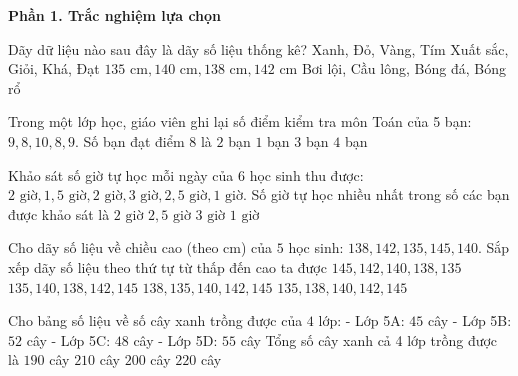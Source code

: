 \textbf{Phần 1. Trắc nghiệm lựa chọn}

\begin{ex} %
Dãy dữ liệu nào sau đây là dãy số liệu thống kê?
\choice
{Xanh, Đỏ, Vàng, Tím}
{Xuất sắc, Giỏi, Khá, Đạt}
{\True $135\text{ cm}, 140\text{ cm}, 138\text{ cm}, 142\text{ cm}$}
{Bơi lội, Cầu lông, Bóng đá, Bóng rổ}
\end{ex}

\begin{ex} %
Trong một lớp học, giáo viên ghi lại số điểm kiểm tra môn Toán của 5 bạn: $9, 8, 10, 8, 9$. Số bạn đạt điểm $8$ là
\choice
{\True $2$ bạn}
{$1$ bạn}
{$3$ bạn}
{$4$ bạn}
\end{ex}

\begin{ex} %
Khảo sát số giờ tự học mỗi ngày của $6$ học sinh thu được: $2\text{ giờ}, 1{,}5\text{ giờ}, 2\text{ giờ}, 3\text{ giờ}, 2{,}5\text{ giờ}, 1\text{ giờ}$. Số giờ tự học nhiều nhất trong số các bạn được khảo sát là
\choice
{$2\text{ giờ}$}
{$2{,}5\text{ giờ}$}
{\True $3\text{ giờ}$}
{$1\text{ giờ}$}
\end{ex}

\begin{ex} %
Cho dãy số liệu về chiều cao (theo $\text{cm}$) của $5$ học sinh: $138, 142, 135, 145, 140$. Sắp xếp dãy số liệu theo thứ tự từ thấp đến cao ta được
\choice
{$145, 142, 140, 138, 135$}
{$135, 140, 138, 142, 145$}
{$138, 135, 140, 142, 145$}
{\True $135, 138, 140, 142, 145$}
\end{ex}

\begin{ex} %
Cho bảng số liệu về số cây xanh trồng được của $4$ lớp:
- Lớp 5A: $45$ cây
- Lớp 5B: $52$ cây
- Lớp 5C: $48$ cây
- Lớp 5D: $55$ cây
Tổng số cây xanh cả 4 lớp trồng được là
\choice
{$190$ cây}
{$210$ cây}
{\True $200$ cây}
{$220$ cây}
\end{ex}

